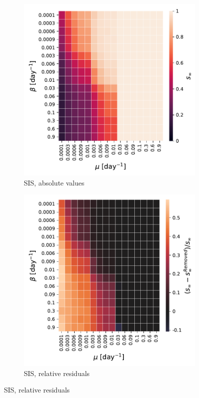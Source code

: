 \documentclass[a4paper,11pt, twocolumn]{article}
\begin{document}
\begin{figure}[H]
\begin{subfigure}[t]{0.24\textwidth}
\centering
\includegraphics[scale=0.30]{./Figure/Simulations/SIS_temporal_30330_rm5.pdf}
\caption{SIS, absolute values}
\end{subfigure}
\begin{subfigure}[t]{0.24\textwidth}
 \centering
\includegraphics[scale=0.30]{./Figure/Simulations/SIS_temporal_30330_rm5_diff.pdf}
\caption{SIS, relative residuals}
\end{subfigure}


\end{figure}
\end{document}
